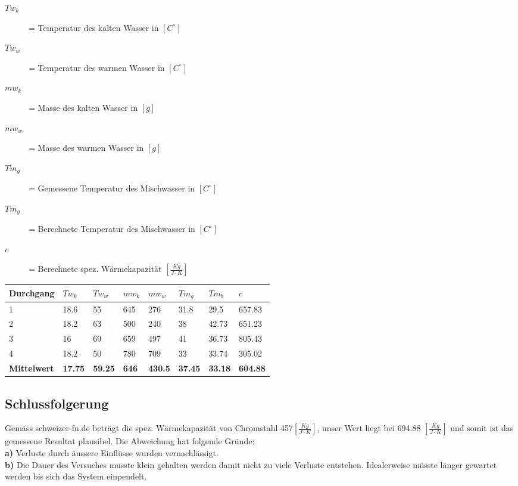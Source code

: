\documentclass{article}
\begin{document}
  \begin{description}
    \item[\textbf{ $Tw_k$}]= Temperatur des kalten Wasser in $[C^\circ]$
    \item[\textbf{ $Tw_w$}]= Temperatur des warmen Wasser in $[C^\circ]$
    \item[\textbf{ $mw_k$}]= Masse des kalten Wasser in $[g]$
    \item[\textbf{ $mw_w$}]= Masse des warmen Wasser in $[g]$
    \item[\textbf{ $Tm_g$}]= Gemessene Temperatur des Mischwasser in  $[C^\circ]$
    \item[\textbf{ $Tm_g$}]= Berechnete Temperatur des Mischwasser in  $[C^\circ]$
    \item[\textbf{ $c$}]=  Berechnete spez. Wärmekapazität  $[\frac{Kg}{J \cdot K}]$
    
  \end{description}
\begin{table}[h]
    \begin{tabular}{|l|l|l|l|l|l|l|l|}
    
        \hline
        Durchgang &\textbf{$Tw_k$} &\textbf{$Tw_w$}& \textbf{$mw_k$}&\textbf{$mw_w$}&\textbf{$Tm_g$}&\textbf{$Tm_b$}&\textbf{$c$}\\ \hline
        1         & 18.6 & 55 & 645& 276 & 31.8 &29.5&657.83\\ 
        2         & 18.2 & 63 &500 &240  & 38 &42.73&651.23\\ 
        3         & 16 & 69 &659 &497  &41 &36.73&805.43\\ 
        4         &  18.2  &50 & 780 & 709 &33&33.74&305.02\\ \hline
        \textbf{Mittelwert} &\textbf{17.75}&\textbf{59.25}&\textbf{646}  &\textbf{430.5}  &\textbf{37.45} &\textbf{33.18}&\textbf{604.88} \\ 
        \hline
    \end{tabular}
\end{table}

\subsection*{Schlussfolgerung}
Gemäss schweizer-fn.de beträgt die spez. Wärmekapazität von Chromstahl 457$[\frac{Kg}{J \cdot K}]$, unser Wert liegt bei 694.88 $[\frac{Kg}{J \cdot K}]$ und somit ist das gemessene Resultat plausibel. Die Abweichung hat folgende Gründe:\\
\textbf{a)} Verluste durch äussere Einflüsse wurden vernachlässigt.\\
\textbf{b)} Die Dauer des Versuches musste klein gehalten werden damit nicht zu viele Verluste entstehen. Idealerweise müsste länger gewartet werden bis sich das System einpendelt.
\end{document}
